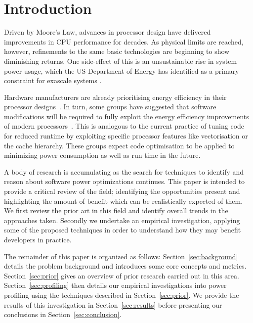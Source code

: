 \section*{Introduction \golden}
Driven by Moore's Law, advances in processor design have delivered improvements in CPU performance for decades. As physical limits are reached, however, refinements to the same basic technologies are beginning to show diminishing returns. One side-effect of this is an unsustainable rise in system power usage, which the US Department of Energy has identified as a primary constraint for exascale systems \cite{shalf:2011aa}. \golden

Hardware manufacturers are already prioritising energy efficiency in their processor designs~\cite{kurd:2014aa}. In turn, some groups have suggested that software modifications will be required to fully exploit the energy efficiency improvements of modern processors~\cite{shao:2013aa}. This is analogous to the current practice of tuning code for reduced runtime by exploiting specific processor features like vectorisation or the cache hierarchy. These groups expect code optimisation to be applied to minimizing power consumption as well as run time in the future. \golden

A body of research is accumulating as the search for techniques to identify and reason about software power optimizations continues. This paper is intended to provide a critical review of the field; identifying the opportunities present and highlighting the amount of benefit which can be realistically expected of them. We first review the prior art in this field and identify overall trends in the approaches taken. Secondly we undertake an empirical investigation, applying some of the proposed techniques in order to understand how they may benefit developers in practice. \golden

The remainder of this paper is organized as follows: Section~\ref{sec:background} details the problem background and introduces some core concepts and metrics. Section~\ref{sec:prior} gives an overview of prior research carried out in this area. Section~\ref{sec:profiling} then details our empirical investigations into power profiling using the techniques described in Section~\ref{sec:prior}. We provide the results of this investigation in Section~\ref{sec:results} before presenting our conclusions in Section~\ref{sec:conclusion}. \golden